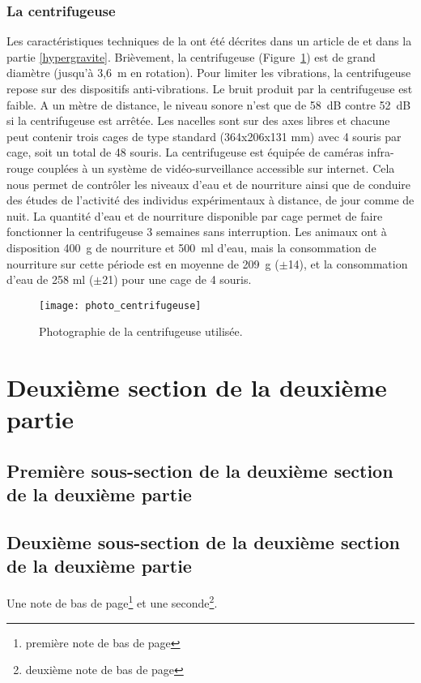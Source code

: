 \subsubsection{La centrifugeuse}
Les caractéristiques techniques de la  ont été décrites dans un article de \cite{jamon_ground-based_2008} et dans la partie \ref{hypergravite}. Brièvement, la centrifugeuse (Figure~\ref{photo_centrifugeuse}) est de grand diamètre (jusqu'à 3,6~m en rotation). Pour limiter les vibrations, la centrifugeuse repose sur des dispositifs anti-vibrations. Le bruit produit par la centrifugeuse est faible. A un mètre de distance, le niveau sonore n'est que de 58~dB contre 52~dB si la centrifugeuse est arrêtée. Les nacelles sont sur des axes libres et chacune peut contenir trois cages de type standard (364x206x131 mm) avec 4 souris par cage, soit un total de 48 souris. La centrifugeuse est équipée de caméras infra-rouge couplées à un système de vidéo-surveillance accessible sur internet. Cela nous permet de contrôler les niveaux d'eau et de nourriture ainsi que de conduire des études de l'activité des individus expérimentaux à distance, de jour comme de nuit. La quantité d'eau et de nourriture disponible par cage permet de faire fonctionner la centrifugeuse 3 semaines sans interruption. Les animaux ont à disposition 400~g de nourriture et 500~ml d'eau, mais la consommation de nourriture sur cette période est en moyenne de 209~g ($\pm$14), et la consommation d'eau de 258 ml ($\pm$21) pour une cage de 4 souris. 
\begin{figure}[h!tbp]
\vspace{0.5cm}
\setcapindent{2em}
  \centering
  \texttt{[image: photo\_centrifugeuse]}
  \caption[Photographie de la centrifugeuse]{Photographie de la centrifugeuse utilisée.}
  \label{photo_centrifugeuse}
\end{figure}
\lipsum[1]
\section{Deuxième section de la deuxième partie}
\lipsum[2]
\subsection{Première sous-section de la deuxième section de la deuxième partie}
\lipsum[4]
\subsection[Sous-sous-sous-partie 2]{Deuxième sous-section de la deuxième section de la deuxième partie} %
\lipsum[4]Une note de bas de page\footnote{première note de bas de page} et une seconde\footnote{deuxième note de bas de page}.
